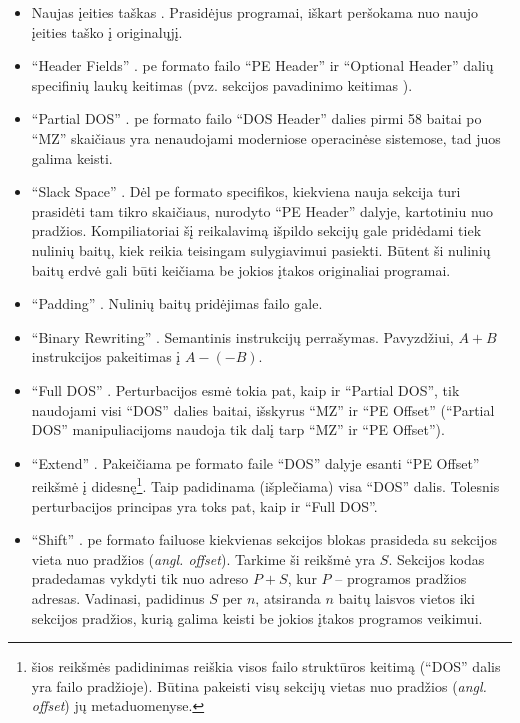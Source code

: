 \begin{itemize}
    \item Naujas įeities taškas \cite{andersonLearningEvadeStatic2018}. Prasidėjus programai, iškart peršokama nuo naujo įeities taško į originalųjį.
    \item \enquote{Header Fields} \cite{demetrioAdversarialEXEmplesSurvey2021}. \acs{pe} formato failo \enquote{PE Header} ir \enquote{Optional Header} dalių specifinių laukų keitimas (pvz. sekcijos pavadinimo keitimas \cite{andersonLearningEvadeStatic2018}).
    \item \enquote{Partial DOS} \cite{demetrioAdversarialEXEmplesSurvey2021}. \acs{pe} formato failo \enquote{DOS Header} dalies pirmi 58 baitai po \enquote{MZ} skaičiaus yra nenaudojami moderniose operacinėse sistemose, tad juos galima keisti.
    \item \enquote{Slack Space} \cite{demetrioAdversarialEXEmplesSurvey2021}. Dėl \acs{pe} formato specifikos, kiekviena nauja sekcija turi prasidėti tam tikro skaičiaus, nurodyto \enquote{PE Header} dalyje, kartotiniu nuo pradžios. Kompiliatoriai šį reikalavimą išpildo sekcijų gale pridėdami tiek nulinių baitų, kiek reikia teisingam sulygiavimui pasiekti. Būtent ši nulinių baitų erdvė gali būti keičiama be jokios įtakos originaliai programai.
    \item \enquote{Padding} \cite{demetrioAdversarialEXEmplesSurvey2021}. Nulinių baitų pridėjimas failo gale.
    \item \enquote{Binary Rewriting} \cite{demetrioAdversarialEXEmplesSurvey2021}. Semantinis instrukcijų perrašymas. Pavyzdžiui, $A+B$ instrukcijos pakeitimas į $A-(-B)$.
    \item \enquote{Full DOS} \cite{demetrioAdversarialEXEmplesSurvey2021}. Perturbacijos esmė tokia pat, kaip ir \enquote{Partial DOS}, tik naudojami visi \enquote{DOS} dalies baitai, išskyrus \enquote{MZ} ir \enquote{PE Offset} (\enquote{Partial DOS} manipuliacijoms naudoja tik dalį tarp \enquote{MZ} ir \enquote{PE Offset}).
    \item \enquote{Extend} \cite{demetrioAdversarialEXEmplesSurvey2021}. Pakeičiama \acs{pe} formato faile \enquote{DOS} dalyje esanti \enquote{PE Offset} reikšmė į didesnę\footnote{\label{footnote:structure}šios reikšmės padidinimas reiškia visos failo struktūros keitimą (\enquote{DOS} dalis yra failo pradžioje). Būtina pakeisti visų sekcijų vietas nuo pradžios (\textit{angl. offset}) jų metaduomenyse.}. Taip padidinama (išplečiama) visa \enquote{DOS} dalis. Tolesnis perturbacijos principas yra toks pat, kaip ir \enquote{Full DOS}.
    \item \enquote{Shift} \cite{demetrioAdversarialEXEmplesSurvey2021}. \acs{pe} formato failuose kiekvienas sekcijos blokas prasideda su sekcijos vieta nuo pradžios (\textit{angl. offset}). Tarkime ši reikšmė yra $S$. Sekcijos kodas pradedamas vykdyti tik nuo adreso $P+S$, kur $P$ -- programos pradžios adresas. Vadinasi, padidinus $S$ per $n$, atsiranda $n$ baitų laisvos vietos iki sekcijos pradžios, kurią galima keisti be jokios įtakos programos veikimui.
\end{itemize}